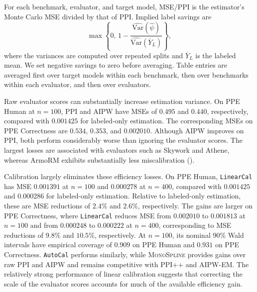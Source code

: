 \documentclass{article}
\theoremstyle{plain}
\theoremstyle{definition}
\newcommand{\Var}{\mathrm{Var}}
\newcommand{\1}{\mathbbm{1}}
\begin{document}
For each benchmark, evaluator, and target model, MSE/PPI is the estimator's
Monte Carlo MSE divided by that of PPI. Implied label savings are
\[
\max\!\left\{0,\,
1-\frac{\widehat{\Var}(\widehat\psi)}{\widehat{\Var}(\overline Y_L)}
\right\},
\]
where the variances are computed over repeated splits and \(\overline Y_L\)
is the labeled mean. We set negative savings to zero before averaging.
Table entries are averaged first over target models within each benchmark,
then over benchmarks within each evaluator, and then over evaluators.


Raw evaluator scores can substantially increase estimation
variance. On PPE Human at $n=100$, PPI and AIPW have MSEs
of $0.495$ and $0.440$, respectively, compared with
$0.001425$ for labeled-only estimation. The corresponding
MSEs on PPE Correctness are $0.534$, $0.353$, and $0.002010$.
Although AIPW improves on PPI, both perform considerably
worse than ignoring the evaluator scores. The largest losses
are associated with evaluators such as Skywork and Athene,
whereas ArmoRM exhibits substantially less miscalibration
().

Calibration largely eliminates these efficiency losses.
On PPE Human, \texttt{LinearCal} has MSE $0.001391$ at
$n=100$ and $0.000278$ at $n=400$, compared with
$0.001425$ and $0.000286$ for labeled-only estimation.
Relative to labeled-only estimation, these are MSE reductions
of $2.4\%$ and $2.6\%$, respectively. The gains are larger on PPE Correctness,
where \texttt{LinearCal} reduces MSE from $0.002010$ to
$0.001813$ at $n=100$ and from $0.000248$ to $0.000222$
at $n=400$, corresponding to MSE reductions of $9.8\%$ and $10.5\%$,
respectively. At $n=100$, its nominal 90\% Wald intervals have empirical
coverage of $0.909$ on PPE Human and $0.931$ on PPE Correctness.
\texttt{AutoCal} performs similarly, while
\textsc{MonoSpline} provides gains over raw PPI and AIPW
and remains competitive with PPI++ and \textsc{AIPW-EM}.
The relatively strong performance of linear calibration
suggests that correcting the scale of the evaluator scores
accounts for much of the available efficiency gain.
\end{document}
